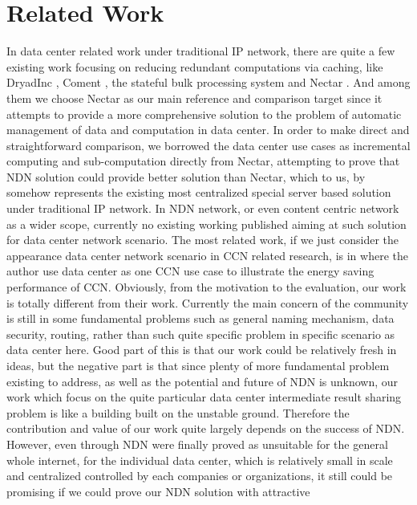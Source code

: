 \section{Related Work}
In data center related work under traditional IP network, there are quite a few
existing work focusing on reducing redundant computations via caching, like
DryadInc \cite{Isard:2007:DDD:1272996.1273005}, Coment
\cite{He:2010:CBS:1807128.1807139}, the stateful bulk processing system
\cite{Logothetis:2010:SBP:1807128.1807138} and Nectar
\cite{gunda2010nectar}. And among them we choose Nectar as our main reference
and comparison target since it attempts to provide a more comprehensive solution
to the problem of automatic management of data and computation in data
center. In order to make direct and straightforward comparison, we borrowed the
data center use cases as incremental computing and sub-computation directly from
Nectar, attempting to prove that NDN solution could provide better solution than
Nectar, which to us, by somehow represents the existing most centralized special
server based solution under traditional IP network.  In NDN network, or even
content centric network as a wider scope, currently no existing working
published aiming at such solution for data center network scenario. The most
related work, if we just consider the appearance data center network scenario in
CCN related research, is in \cite{lee2010greening} where the author use data
center as one CCN use case to illustrate the energy saving performance of
CCN. Obviously, from the motivation to the evaluation, our work is totally
different from their work.  Currently the main concern of the community is still
in some fundamental problems such as general naming mechanism, data security,
routing, rather than such quite specific problem in specific scenario as data
center here. Good part of this is that our work could be relatively fresh in
ideas, but the negative part is that since plenty of more fundamental problem
existing to address, as well as the potential and future of NDN is unknown, our
work which focus on the quite particular data center intermediate result sharing
problem is like a building built on the unstable ground. Therefore the
contribution and value of our work quite largely depends on the success of
NDN. However, even through NDN were finally proved as unsuitable for the general
whole internet, for the individual data center, which is relatively small in
scale and centralized controlled by each companies or organizations, it still
could be promising if we could prove our NDN solution with attractive
